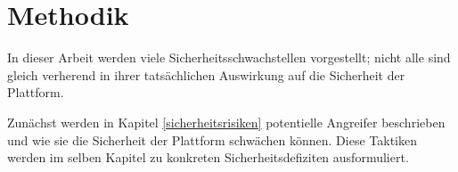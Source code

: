 \newpage
\section{Methodik} \label{methodik}






In dieser Arbeit werden viele Sicherheitsschwachstellen vorgestellt; nicht alle
sind gleich verherend in ihrer tatsächlichen Auswirkung auf die Sicherheit der
Plattform.

Zunächst werden in Kapitel \ref{sicherheitsrisiken} potentielle Angreifer
beschrieben und wie sie die Sicherheit der Plattform schwächen können. Diese
Taktiken werden im selben Kapitel zu konkreten Sicherheitsdefiziten
ausformuliert.





